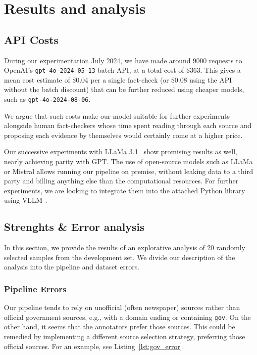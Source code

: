 
\section{Results and analysis}
\label{sec:results}



\subsection{API Costs}
During our experimentation July 2024, we have made around 9000 requests to OpenAI's \texttt{gpt-4o-2024-05-13} batch API, at a total cost of \$363.
This gives a mean cost estimate of \$0.04 per a single fact-check (or \$0.08 using the API without the batch discount) that can be further reduced using cheaper models, such as \texttt{gpt-4o-2024-08-06}.

We argue that such costs make our model suitable for further experiments alongside human fact-checkers whose time spent reading through each source and proposing each evidence by themselves would certainly come at a higher price.

Our successive experiments with LLaMa 3.1~\cite{meta2024llama31} show promising results as well, nearly achieving parity with GPT.
The use of open-source models such as LLaMa or Mistral allows running our pipeline on premise, without leaking data to a third party and billing anything else than the computational resources.
For further experiments, we are looking to integrate them into the attached Python library using VLLM~\cite{vllm}.

\subsection{Strenghts \& Error analysis}
In this section, we provide the results of an explorative analysis of 20 randomly selected samples from the development set. We divide our description of the analysis into the pipeline and dataset errors.


\subsubsection{Pipeline Errors}
Our pipeline tends to rely on unofficial (often newspaper) sources rather than official government sources, e.g., with a domain ending or containing \texttt{gov}. On the other hand, it seems that the annotators prefer those sources. This could be remedied by implementing a different source selection strategy, preferring those official sources. For an example, see Listing~\ref{lst:gov_error}.

